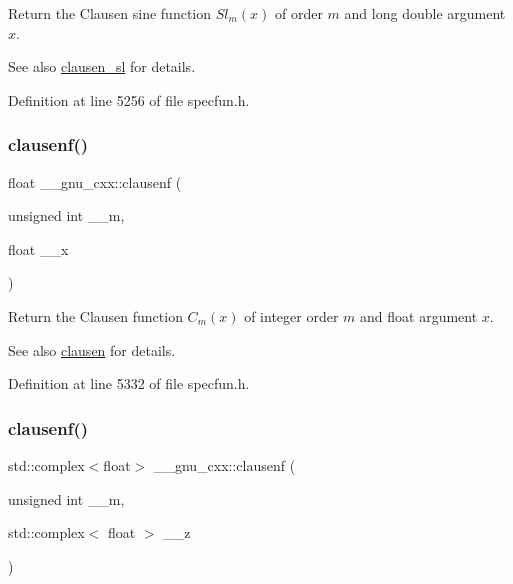 Return the Clausen sine function $ Sl_m(x) $ of order $ m $ and {\ttfamily long double} argument $ x $.

\begin{DoxySeeAlso}{See also}
\hyperlink{group__gnu__math__spec__func_gacb757b00309213cd96bb2bc6b5dc3c24}{clausen\+\_\+sl} for details. 
\end{DoxySeeAlso}


Definition at line 5256 of file specfun.\+h.

\mbox{\label{group__gnu__math__spec__func_ga6422bdec1a3c930fb1623094cd2eaff2}} 
\subsubsection{\texorpdfstring{clausenf()}{clausenf()}\hspace{0.1cm}{\footnotesize\ttfamily [1/2]}}
{\footnotesize\ttfamily float \+\_\+\+\_\+gnu\+\_\+cxx\+::clausenf (\begin{DoxyParamCaption}\item[{unsigned int}]{\+\_\+\+\_\+m,  }\item[{float}]{\+\_\+\+\_\+x }\end{DoxyParamCaption})\hspace{0.3cm}{\ttfamily [inline]}}

Return the Clausen function $ C_m(x) $ of integer order $ m $ and {\ttfamily float} argument $ x $.

\begin{DoxySeeAlso}{See also}
\hyperlink{group__gnu__math__spec__func_ga54e4ba71b1f81718d6998349f91ff88f}{clausen} for details. 
\end{DoxySeeAlso}


Definition at line 5332 of file specfun.\+h.

\mbox{\label{group__gnu__math__spec__func_ga98b5ba1e5de4ef2e0e9422ac8d9ce2ad}} 
\subsubsection{\texorpdfstring{clausenf()}{clausenf()}\hspace{0.1cm}{\footnotesize\ttfamily [2/2]}}
{\footnotesize\ttfamily std\+::complex$<$float$>$ \+\_\+\+\_\+gnu\+\_\+cxx\+::clausenf (\begin{DoxyParamCaption}\item[{unsigned int}]{\+\_\+\+\_\+m,  }\item[{std\+::complex$<$ float $>$}]{\+\_\+\+\_\+z }\end{DoxyParamCaption})\hspace{0.3cm}{\ttfamily [inline]}}

